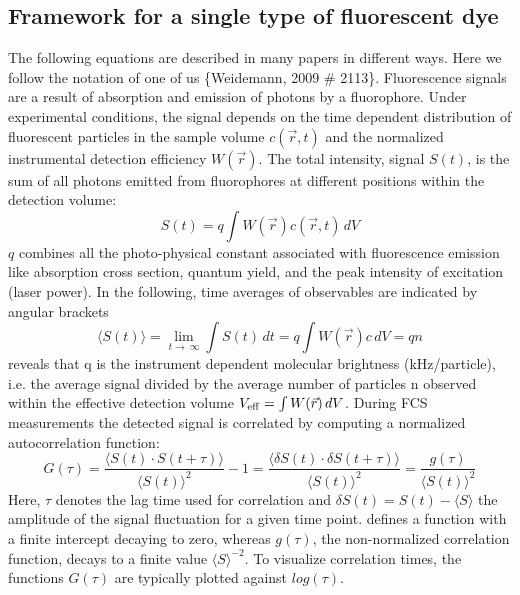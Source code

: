 \subsection{Framework for a single type of fluorescent dye}
\label{sec:theor.frame}
The following equations are described in many papers in different ways. Here we follow the notation of one of us \{Weidemann, 2009 \# 2113\}. Fluorescence signals are a result of absorption and emission of photons by a fluorophore. Under experimental conditions, the signal depends on the time dependent distribution of fluorescent particles in the sample volume $c(\vec{r},t)$ and the normalized instrumental detection efficiency $W(\vec{r})$. The total intensity, signal $S(t)$, is the sum of all photons emitted from fluorophores at different positions within the detection volume:
	\begin{equation}
	\label{eq1}
	S(t) = q \int W(\vec{r})  c(\vec{r},t) \,dV
	\end{equation}
$q$ combines all the photo-physical constant associated with fluorescence emission like absorption cross section, quantum yield, and the peak intensity of excitation (laser power). In the following, time averages of observables are indicated by angular brackets	
	\begin{equation}
	\label{eq2}
	\langle S(t) \rangle = \lim_{t\to\ \infty} \int S(t) \,dt = q \int W(\vec{r})  c \,dV = qn
	\end{equation}
 reveals that q is the instrument dependent molecular brightness (kHz/particle), i.e. the average signal divided by the average number of particles n observed within the effective detection volume $V_{\rm eff} = \int W(\vec{r})  \,dV$. During FCS measurements the detected signal is correlated by computing a normalized autocorrelation function: 
	\begin{equation}
	\label{eq3}
	G(\tau) = \frac{\langle S(t) \cdot S(t+\tau)\rangle}{\langle S(t) \rangle^2}-1 = \frac{\langle \delta S(t) \cdot \delta S(t+\tau)\rangle}{\langle S(t) \rangle^2} = \frac{g(\tau)}{\langle S(t) \rangle^2}
	\end{equation}
Here, $\tau$ denotes the lag time used for correlation and $\delta S(t) = S(t)-\langle S \rangle$ the amplitude of the signal fluctuation for a given time point.  defines a function with a finite intercept decaying to zero, whereas $g(\tau)$, the non-normalized correlation function, decays to a finite value $\langle S \rangle^{-2}$. To visualize correlation times, the functions $G(\tau)$ are typically plotted against $log(\tau)$. %

